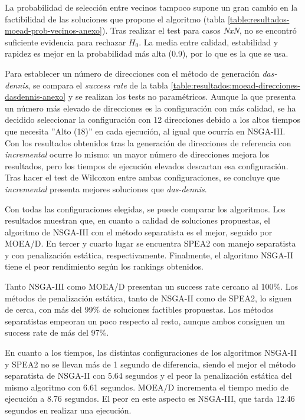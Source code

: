 La probabilidad de selección entre vecinos tampoco supone un gran cambio en la factibilidad de las soluciones que propone el algoritmo (tabla \ref{table:resultados-moead-prob-vecinos-anexo}). Tras realizar el test para casos \textit{NxN}, no se encontró suficiente evidencia para rechazar \(H_0\). La media entre calidad, estabilidad y rapidez es mejor en la probabilidad más alta (0.9), por lo que es la que se usa.

Para establecer un número de direcciones con el método de generación \textit{das-dennis}, se compara el \textit{success rate} de la tabla \ref{table:resultados:moead-direcciones-dasdennis-anexo} y se realizan los tests no paramétricos. Aunque la que presenta un número más elevado de direcciones es la configuración con más calidad, se ha decidido seleccionar la configuración con 12 direcciones debido a los altos tiempos que necesita ''Alto (18)'' en cada ejecución, al igual que ocurría en NSGA-III. Con los resultados obtenidos tras la generación de direcciones de referencia con \textit{incremental} ocurre lo mismo: un mayor número de direcciones mejora los resultados, pero los tiempos de ejecución elevados descartan esa configuración. Tras hacer el test de Wilcoxon entre ambas configuraciones, se concluye que \textit{incremental} presenta mejores soluciones que \textit{das-dennis}.

Con todas las configuraciones elegidas, se puede comparar los algoritmos. Los resultados muestran que, en cuanto a calidad de soluciones propuestas, el algoritmo de NSGA-III con el método separatista es el mejor, seguido por MOEA/D. En tercer y cuarto lugar se encuentra SPEA2 con manejo separatista y con penalización estática, respectivamente. Finalmente, el algoritmo NSGA-II tiene el peor rendimiento según los rankings obtenidos.

Tanto NSGA-III como MOEA/D presentan un success rate cercano al 100\%. Los métodos de penalización estática, tanto de NSGA-II como de SPEA2, lo siguen de cerca, con más del 99\% de soluciones factibles propuestas. Los métodos separatistas empeoran un poco respecto al resto, aunque ambos consiguen un success rate de más del 97\%.

En cuanto a los tiempos, las distintas configuraciones de los algoritmos NSGA-II y SPEA2 no se llevan más de 1 segundo de diferencia, siendo el mejor el método separatista de NSGA-II con 5.64 segundos y el peor la penalización estática del mismo algoritmo con 6.61 segundos. MOEA/D incrementa el tiempo medio de ejecución a 8.76 segundos. El peor en este aspecto es NSGA-III, que tarda 12.46 segundos en realizar una ejecución.

